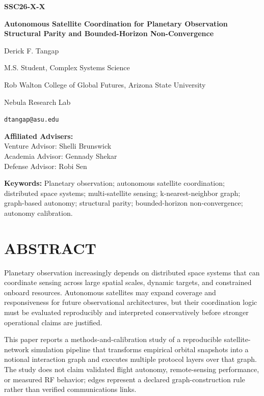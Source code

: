 \documentclass[fleqn,10pt,letterpaper]{article}
\begin{document}
\begin{flushright}
\textbf{SSC26-X-X}
\end{flushright}

\begin{center}
{\fontsize{12}{14}\selectfont\bfseries Autonomous Satellite Coordination for Planetary Observation\\
 Structural Parity and Bounded-Horizon Non-Convergence\par}
\vspace{0.5cm}
{\small Derick F. Tangap\par}
{\small M.S. Student, Complex Systems Science\par}
{\small Rob Walton College of Global Futures, Arizona State University\par}
{\small Nebula Research Lab\par}
{\small \texttt{dtangap@asu.edu}\par}
\vspace{0.4cm}
\noindent\textbf{Affiliated Advisers:}\\
Venture Advisor: Shelli Brunswick\\
Academia Advisor: Gennady Shekar\\
Defense Advisor: Robi Sen
\end{center}

\noindent\textbf{Keywords:} Planetary observation; autonomous satellite coordination; distributed space systems; multi-satellite sensing; k-nearest-neighbor graph; graph-based autonomy; structural parity; bounded-horizon non-convergence; autonomy calibration.

\section*{ABSTRACT}

Planetary observation increasingly depends on distributed space systems that can coordinate sensing across large spatial scales, dynamic targets, and constrained onboard resources. Autonomous satellites may expand coverage and responsiveness for future observational architectures, but their coordination logic must be evaluated reproducibly and interpreted conservatively before stronger operational claims are justified.

This paper reports a methods-and-calibration study of a reproducible satellite-network simulation pipeline that transforms empirical orbital snapshots into a notional interaction graph and executes multiple protocol layers over that graph. The study does not claim validated flight autonomy, remote-sensing performance, or measured RF behavior; edges represent a declared graph-construction rule rather than verified communications links.
\end{document}
